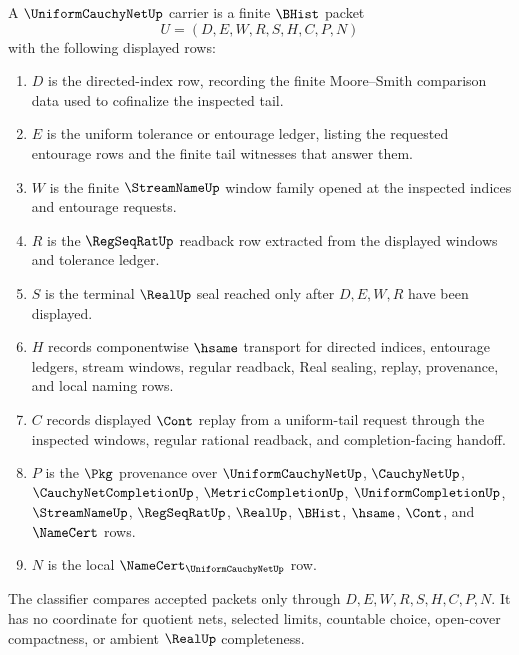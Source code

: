 \begin{definition}
\label{def:uniform-cauchy-net-carrier}
A $\UniformCauchyNetUp$ carrier is a finite $\BHist$ packet
$$
U=(D,E,W,R,S,H,C,P,N)
$$
with the following displayed rows:
\begin{enumerate}
\item $D$ is the directed-index row, recording the finite Moore--Smith comparison data used to cofinalize the inspected tail.
\item $E$ is the uniform tolerance or entourage ledger, listing the requested entourage rows and the finite tail witnesses that answer them.
\item $W$ is the finite $\StreamNameUp$ window family opened at the inspected indices and entourage requests.
\item $R$ is the $\RegSeqRatUp$ readback row extracted from the displayed windows and tolerance ledger.
\item $S$ is the terminal $\RealUp$ seal reached only after $D,E,W,R$ have been displayed.
\item $H$ records componentwise $\hsame$ transport for directed indices, entourage ledgers, stream windows, regular readback, Real sealing, replay, provenance, and local naming rows.
\item $C$ records displayed $\Cont$ replay from a uniform-tail request through the inspected windows, regular rational readback, and completion-facing handoff.
\item $P$ is the $\Pkg$ provenance over $\UniformCauchyNetUp$, $\CauchyNetUp$, $\CauchyNetCompletionUp$, $\MetricCompletionUp$, $\UniformCompletionUp$, $\StreamNameUp$, $\RegSeqRatUp$, $\RealUp$, $\BHist$, $\hsame$, $\Cont$, and $\NameCert$ rows.
\item $N$ is the local $\NameCert_{\UniformCauchyNetUp}$ row.
\end{enumerate}
The classifier compares accepted packets only through $D,E,W,R,S,H,C,P,N$. It has no coordinate for quotient nets, selected limits, countable choice, open-cover compactness, or ambient $\RealUp$ completeness.
\end{definition}

